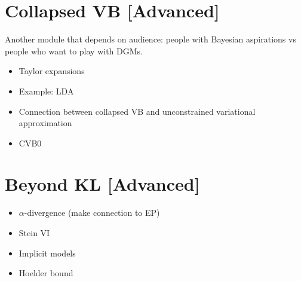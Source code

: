 \documentclass[11pt, a4paper]{article}
\begin{document}
\section{Collapsed VB [Advanced]}

Another module that depends on audience: people with Bayesian aspirations vs people who want to play with DGMs.

\begin{itemize}
\item Taylor expansions
\item Example: LDA
\item Connection between collapsed VB and unconstrained variational approximation \citep{TehEtAl:2007}
\item CVB0 \citep{AsuncionEtAl:2009}
\end{itemize}

\section{Beyond KL [Advanced]}
\begin{itemize}
\item $ \alpha $-divergence (make connection to EP)
\item Stein VI
\item Implicit models
\item Hoelder bound
\end{itemize}




\end{document}
